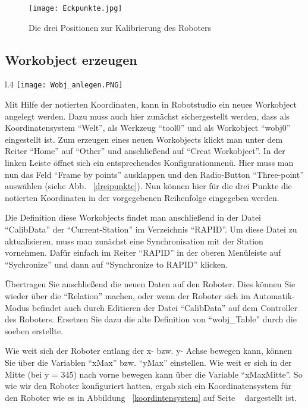\begin{figure}[htbp]
\centering
\texttt{[image: Eckpunkte.jpg]}
\caption{Die drei Positionen zur Kalibrierung des Roboters} 
\label{eckpunkte}
\end{figure}

\subsection{Workobject erzeugen}

\begin{wrapfigure}{l}{.4\textwidth}
\centering
\texttt{[image: Wobj\_anlegen.PNG]}
\vspace{-15pt}
\caption{Workobject über drei Punkte definieren} 
\label{dreipunkte}
\end{wrapfigure}

Mit Hilfe der notierten Koordinaten, kann in Robotstudio ein neues Workobject angelegt werden. Dazu muss auch hier zunächst sichergestellt werden, dass als Koordinatensystem \enquote{Welt}, als Werkzeug \enquote{tool0} und als Workobject \enquote{wobj0} eingestellt ist. Zum erzeugen eines neuen Workobjects klickt man unter dem Reiter \enquote{Home} auf \enquote{Other} und anschließend auf \enquote{Creat Workobject}. In der linken Leiste öffnet sich ein entsprechendes Konfigurationmenü. Hier muss man nun das Feld \enquote{Frame by points} ausklappen und den Radio-Button \enquote{Three-point} auswählen (siehe Abb. ~\ref{dreipunkte}). Nun können hier für die drei Punkte die notierten Koordinaten  in der vorgegebenen Reihenfolge eingegeben werden.  

Die Definition diese Workobjects findet man anschließend in der Datei \enquote{CalibData} der \enquote{Current-Station} im Verzeichnis \enquote{RAPID}. Um diese Datei zu aktualisieren, muss man zunächst eine Synchronisation mit der Station vornehmen. Dafür einfach im Reiter \enquote{RAPID} in der oberen Menüleiste auf \enquote{Sychronize} und dann auf \enquote{Synchronize to RAPID} klicken. 

Übertragen Sie anschließend die neuen Daten auf den Roboter. Dies können Sie wieder über die \enquote{Relation} machen, oder wenn der Roboter sich im Automatik-Modus befindet auch durch Editieren der Datei \enquote{CalibData} auf dem Controller des Roboters. 
Ersetzen Sie dazu die alte Definition von \enquote{wobj\_Table} durch die soeben erstellte. 

Wie weit sich der Roboter entlang der x- bzw. y- Achse bewegen kann, können Sie über die Variablen \enquote{xMax} bzw. \enquote{yMax} einstellen. Wie weit er sich in der Mitte (bei y = 345) nach vorne bewegen kann über die Variable \enquote{xMaxMitte}. So wie wir den Roboter konfiguriert hatten, ergab sich ein Koordinatensystem für den Roboter wie es in Abbildung ~\ref{koordintensystem} auf Seite ~\pageref{koordintensystem} dargestellt ist. 

